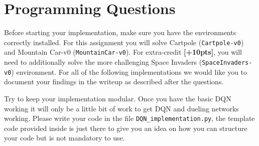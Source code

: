 \documentclass[12pt]{article}
\begin{document}
\section{Programming Questions}
Before starting your implementation, make sure you have the environments correctly installed.
For this assignment you will solve Cartpole (\texttt{Cartpole-v0}) and Mountain Car-v0 (\texttt{MountainCar-v0}). For extra-credit \textbf{[+10pts]}, you will need to additionally solve the more challenging Space Invaders (\texttt{SpaceInvaders-v0}) environment. For all of the following implementations we would like you to document your findings in the writeup as described after the questions.

Try to keep your implementation modular. Once you have the basic DQN working it will only be a little bit of work to get DQN and dueling networks working. Please write your code in the file \texttt{DQN\_implementation.py}, the template code provided inside is just there to give you an idea on how you can structure your code but is not mandatory to use.
\end{document}
